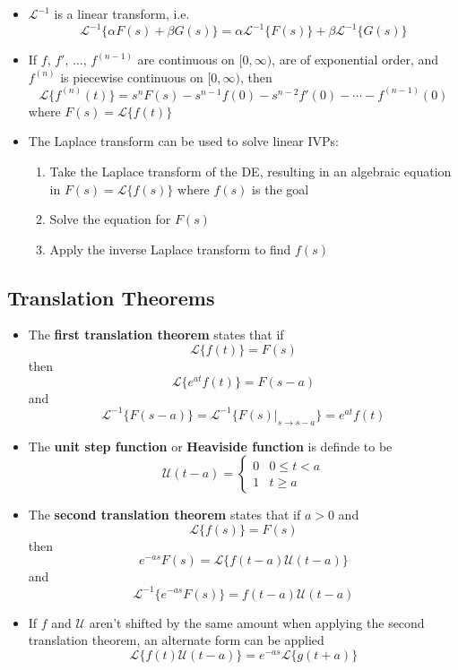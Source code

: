 \documentclass{article}
\begin{document}
\begin{itemize}
  \item $\mathcal{L}^{-1}$ is a linear transform, i.e. \[\mathcal{L}^{-1}\{\alpha F(s) + \beta G(s)\} = \alpha \mathcal{L}^{-1}\{F(s)\} + \beta \mathcal{L}^{-1}\{G(s)\}\]

  \item If $f$, $f'$, $\ldots$, $f^{(n - 1)}$ are continuous on $[0, \infty)$, are of exponential order, and $f^{(n)}$ is piecewise continuous on $[0, \infty)$, then \[\mathcal{L}\{f^{(n)}(t)\} = s^n F(s) - s^{n - 1} f(0) - s^{n - 2} f'(0) - \cdots - f^{(n - 1)}(0)\] where $F(s) = \mathcal{L}\{f(t)\}$

  \item The Laplace transform can be used to solve linear IVPs:

        \begin{enumerate}
          \item Take the Laplace transform of the DE, resulting in an algebraic equation in $F(s) = \mathcal{L}\{f(s)\}$ where $f(s)$ is the goal

          \item Solve the equation for $F(s)$

          \item Apply the inverse Laplace transform to find $f(s)$
        \end{enumerate}
\end{itemize}

\subsection{Translation Theorems}

\begin{itemize}
  \item The \textbf{first translation theorem} states that if \[\mathcal{L}\{f(t)\} = F(s)\] then \[\mathcal{L}\{e^{a t} f(t)\} = F(s - a)\] and \[\mathcal{L}^{-1}\{F(s - a)\} = \mathcal{L}^{-1}\{F(s)|_{s \rightarrow s - a}\} = e^{a t} f(t)\]

  \item The \textbf{unit step function} or \textbf{Heaviside function} is definde to be \[\mathcal{U}(t - a) = \begin{cases}
            0 & 0 \le t < a \\
            1 & t \ge a
          \end{cases}\]

  \item The \textbf{second translation theorem} states that if $a > 0$ and \[\mathcal{L}\{f(s)\} = F(s)\] then \[e^{-a s} F(s) = \mathcal{L}\{f(t - a) \mathcal{U}(t - a)\}\] and \[\mathcal{L}^{-1}\{e^{-a s} F(s)\} = f(t - a) \mathcal{U}(t - a)\]

  \item If $f$ and $\mathcal{U}$ aren't shifted by the same amount when applying the second translation theorem, an alternate form can be applied \[\mathcal{L}\{f(t) \mathcal{U}(t - a)\} = e^{-a s} \mathcal{L}\{g(t + a)\}\]
\end{itemize}
\end{document}
